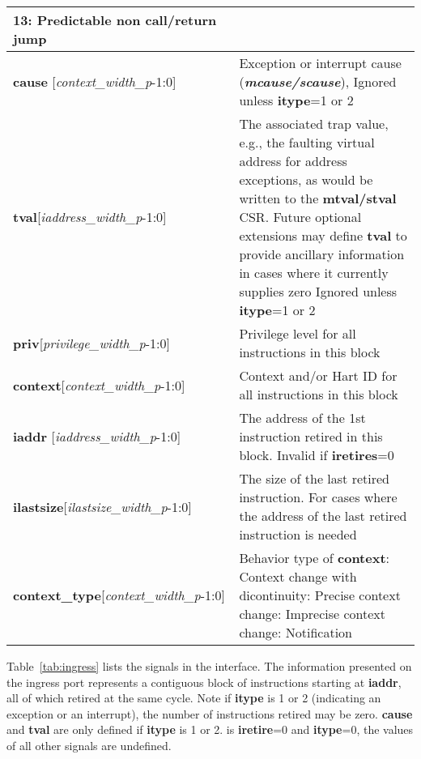 \begin{table}[htp]
\begin{tabulary}{\textwidth}{|l|p{80mm}|}
        13: Predictable non call/return jump\\
        \hline
        \textbf {cause} [\textit{context\_width\_p}-1:0] & Exception or interrupt cause (\textbf{\textit{mcause/scause}}), \newline
        Ignored unless \textbf {itype}=1 or 2\\
        \hline
        \textbf {tval}[\textit{iaddress\_width\_p}-1:0]& The associated trap value, e.g., the
    faulting virtual address for address exceptions, as would be
    written to the \textbf {mtval/stval} CSR. Future optional extensions may define \textbf {tval} to provide ancillary information in cases where it currently supplies zero\newline
    Ignored unless \textbf {itype}=1 or 2\\
        \hline
        \textbf {priv}[\textit{privilege\_width\_p}-1:0] & Privilege level for all instructions in this block\\
        \hline
        \textbf {context}[\textit{context\_width\_p}-1:0] & Context and/or Hart ID for all instructions in this block\\
        \hline
        \textbf {iaddr} [\textit{iaddress\_width\_p}-1:0] & The address of the 1st instruction retired in this block.\newline
        Invalid if \textbf{iretires}=0 \\
        \hline
        \textbf {ilastsize}[\textit{ilastsize\_width\_p}-1:0] & The size of the last retired instruction. For cases where the address of the last retired instruction is needed\\
        \hline
        \textbf {context\_type}[\textit{context\_width\_p}-1:0] & Behavior type of \textbf {context}: Context change with dicontinuity: Precise context change: Imprecise context change: Notification\\
        \hline
    \end{tabulary}
\end{table}

Table~\ref{tab:ingress} lists the signals in the interface. The
information presented on the ingress port represents a contiguous
block of instructions starting at \textbf{iaddr}, all of which retired
at the same cycle. Note if \textbf{itype} is 1 or 2 (indicating an
exception or an interrupt), the number of instructions retired may be
zero. \textbf{cause} and \textbf{tval} are only defined if
\textbf{itype} is 1 or 2. is \textbf {iretire}=0 and \textbf{itype}=0,
the values of all other signals are undefined.


